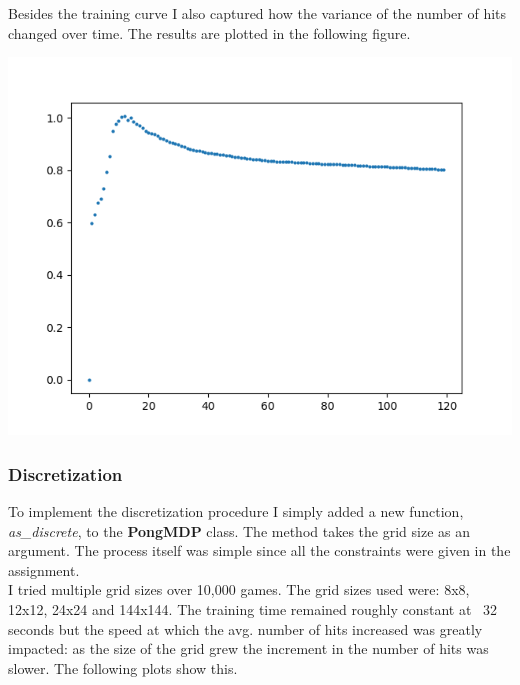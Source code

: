 \documentclass[11pt]{article}
\begin{document}
Besides the training curve I also captured how the variance of the number of hits changed over time. 
The results are plotted in the following figure.

\begin{center}
\includegraphics[scale=1]{part2.1/std.png}
\end{center}

\subsubsection*{Discretization}
To implement the discretization procedure I simply added a new function, \textit{as\_discrete}, to the \textbf{PongMDP} class. The method takes the grid size as an argument. The process itself was simple since all the constraints were given in the assignment. \\

I tried multiple grid sizes over 10,000 games. The grid sizes used were: 8x8, 12x12, 24x24 and 144x144. The training time remained roughly constant at ~32 seconds but the speed at which the avg. number of hits increased was greatly impacted: as the size of the grid grew the increment in the number of hits was slower. The following plots show this.
\end{document}

